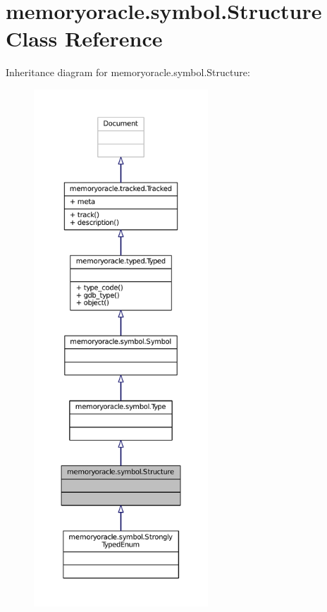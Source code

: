 \hypertarget{classmemoryoracle_1_1symbol_1_1Structure}{}\section{memoryoracle.\+symbol.\+Structure Class Reference}
\label{classmemoryoracle_1_1symbol_1_1Structure}


Inheritance diagram for memoryoracle.\+symbol.\+Structure\+:
\nopagebreak
\begin{figure}[H]
\begin{center}
\leavevmode
\includegraphics[height=550pt]{classmemoryoracle_1_1symbol_1_1Structure__inherit__graph}
\end{center}
\end{figure}


